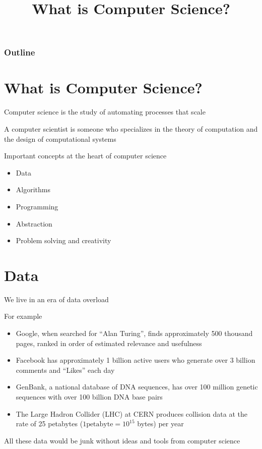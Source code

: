 \documentclass[8pt,a4paper,compress]{beamer}
\title{What is Computer Science?}
\date{}
\begin{document}
\begin{frame}
\vfill
\titlepage
\end{frame}

\begin{frame}
\frametitle{Outline}
\tableofcontents
\end{frame}

\section{What is Computer Science?}
\begin{frame}[fragile]
\pause

Computer science is the study of automating processes that scale

\pause
\bigskip

A computer scientist is someone who specializes in the theory of computation and the design of computational systems

\pause
\bigskip

Important concepts at the heart of computer science
\begin{itemize}
\item Data
\item Algorithms
\item Programming
\item Abstraction
\item Problem solving and creativity
\end{itemize}
\end{frame}

\section{Data}
\begin{frame}[fragile]
\pause

We live in an era of data overload

\pause
\bigskip

For example
\begin{itemize}
\item Google, when searched for ``Alan Turing'', finds approximately 500 thousand pages, ranked in order of estimated relevance and usefulness 
\item Facebook has approximately 1 billion active users who generate over 3 billion comments and ``Likes'' each day 
\item GenBank, a national database of DNA sequences, has over 100 million genetic sequences with over 100 billion DNA base pairs 
\item The Large Hadron Collider (LHC) at CERN produces collision data at the rate of 25 petabytes ($1 \text{petabyte} = 10^{15}$ bytes) per year
\end{itemize}

\pause
\bigskip

All these data would be junk without ideas and tools from computer science
\end{frame}
\end{document}

